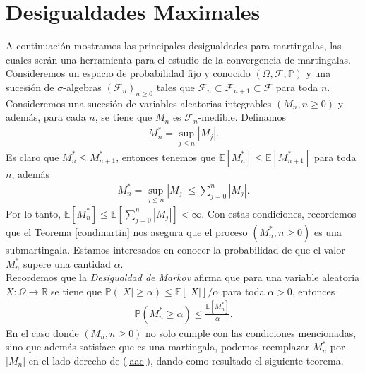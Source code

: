 \section{Desigualdades Maximales}
A continuación mostramos las principales desigualdades para martingalas, las cuales serán una herramienta para el estudio de la convergencia de martingalas. Consideremos un espacio de probabilidad fijo y conocido $(\Omega, \mathcal{F}, \mathbb{P})$ y una sucesión de $\sigma$-algebras $(\mathcal{F}_n)_{n \geq 0}$ tales que $\mathcal{F}_n \subset \mathcal{F}_{n+1} \subset \mathcal{F}$ para toda $n$. Consideremos una sucesión de variables aleatorias integrables $(M_n, n \geq 0)$ y además, para cada $n$, se tiene que $M_n$ es $\mathcal{F}_n$-medible. Definamos
\begin{align*}
	M_n^{*} = \sup_{j \leq n} |M_j|.
\end{align*}
Es claro que $M_n^{*} \leq M_{n+1}^{*}$, entonces tenemos que $\mathbb{E}[M_n^{*}] \leq \mathbb{E}[M_{n+1}^{*}]$ para toda $n$, además 
\begin{align*}
	M_n^{*} = \sup_{j \leq n} |M_j| \leq \sum_{j=0}^n |M_j|.
\end{align*}
Por lo tanto, $\mathbb{E}[M_n^{*} ]\leq \mathbb{E}[\sum_{j=0}^n |M_j|] < \infty$. Con estas condiciones, recordemos que el Teorema \ref{condmartin} nos asegura que el proceso $(M_n^{*}, n \geq 0)$ es una submartingala. Estamos interesados en conocer la probabilidad de que el valor $M_n^{*}$ supere una cantidad $\alpha$. \\

Recordemos que la \emph{Desigualdad de Markov} afirma que \cite[p.~29]{jacodprotter} para una variable aleatoria $X: \Omega \rightarrow \mathbb{R}$ se tiene que $\mathbb{P}(|X| \geq \alpha) \leq \mathbb{E}[|X|]/\alpha$ para toda $\alpha > 0$, entonces
\begin{align}
	\mathbb{P}(M_n^{*} \geq \alpha) \leq \frac{\mathbb{E}[M_n^{*}]}{\alpha}. \label{aac}
\end{align}
En el caso donde $(M_n, n \geq 0)$ no solo cumple con las condiciones mencionadas, sino que además satisface que es una martingala, podemos reemplazar $M_n^{*}$ por $|M_n|$ en el lado derecho de (\ref{aac}), dando como resultado el siguiente teorema.


